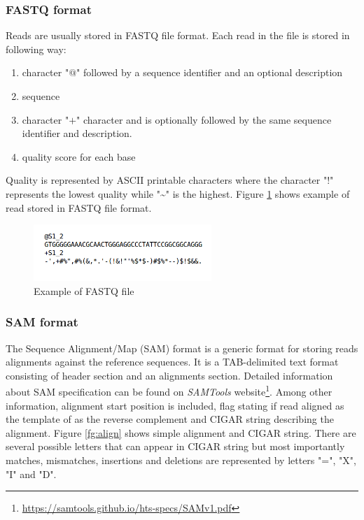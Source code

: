 \documentclass[times, utf8, diplomski, numeric, english]{fer}
\begin{document}
\subsubsection{FASTQ format}
Reads are usually stored in FASTQ file format. Each read in the file is stored in following way:
\begin{enumerate}
	\item character "$@$" followed  by a sequence identifier and an optional description 
	\item sequence
	\item character "$+$" character and is optionally followed by the same sequence identifier and description.
	\item quality score for each base
\end{enumerate}
Quality is represented by ASCII printable characters where
the character "$!$" represents the lowest quality while "\textasciitilde" is the highest. Figure \ref{fg:fq} shows example of read stored in FASTQ file format.
\begin{figure}[!ht]
	\begin{center}
		\includegraphics[width=0.6\textwidth]{./imgs/fq.png}
		\caption{Example of FASTQ file}
		\label{fg:fq}
	\end{center}
\end{figure} 

\subsubsection{SAM format}
The Sequence Alignment/Map (SAM) format is a generic format for storing reads alignments against the reference sequences. It is a TAB-delimited text format consisting
of header section and an alignments section. Detailed information about SAM specification can be found on \textit{SAMTools} website\footnote{\url{https://samtools.github.io/hts-specs/SAMv1.pdf}}.
Among other information, alignment start position is included, flag stating if read aligned as the template of as the reverse complement and CIGAR string describing the alignment.
Figure \ref{fg:align} shows simple alignment and CIGAR string. 
There are several possible letters that can appear in CIGAR string but most importantly matches, mismatches, insertions and deletions are represented by letters "=", "X", "I" and "D".
\end{document}
